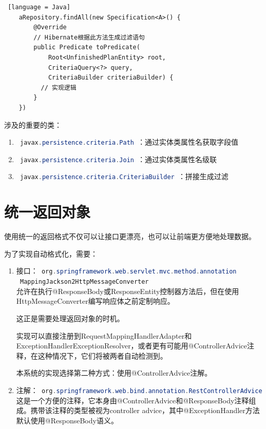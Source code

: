 \begin{enumerate}
\begin{enumerate}
                \begin{lstlisting} [language = Java]
    aRepository.findAll(new Specification<A>() {
        @Override
        // Hibernate根据此方法生成过滤语句
        public Predicate toPredicate(
            Root<UnfinishedPlanEntity> root, 
            CriteriaQuery<?> query, 
            CriteriaBuilder criteriaBuilder) {
          // 实现逻辑
        }
    })             
\end{lstlisting}
                涉及的重要的类：
                \begin{enumerate}
                  \item \lstinline[language = Java]| javax.persistence.criteria.Path |：通过实体类属性名获取字段值
                  \item \lstinline[language = Java]| javax.persistence.criteria.Join |：通过实体类属性名级联
                  \item \lstinline[language = Java]| javax.persistence.criteria.CriteriaBuilder |：拼接生成过滤
                \end{enumerate}
        \end{enumerate}
\end{enumerate}

\section{统一返回对象}

使用统一的返回格式不仅可以让接口更漂亮，也可以让前端更方便地处理数据。

为了实现自动格式化，需要：
\begin{enumerate}
  \item 接口：\lstinline[language = Java]| org.springframework.web.servlet.mvc.method.annotation |\\\lstinline[language = Java]| MappingJackson2HttpMessageConverter |\\
        允许在执行@ResponseBody或ResponseEntity控制器方法后，但在使用HttpMessageConverter编写响应体之前定制响应。

        这正是需要处理返回对象的时机。

        实现可以直接注册到RequestMappingHandlerAdapter和ExceptionHandlerExceptionResolver，或者更有可能用@ControllerAdvice注释，在这种情况下，它们将被两者自动检测到。

        本系统的实现选择第二种方式：使用@ControllerAdvice注解。
  \item 注解：\lstinline[language = Java]| org.springframework.web.bind.annotation.RestControllerAdvice |\\
        这是一个方便的注释，它本身由@ControllerAdvice和@ResponseBody注释组成。携带该注释的类型被视为controller advice，其中@ExceptionHandler方法默认使用@ResponseBody语义。
\end{enumerate}

